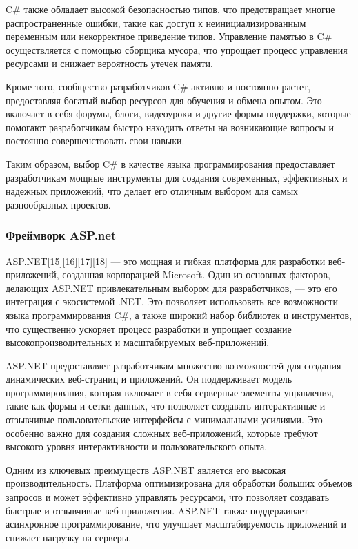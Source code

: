 C\# также обладает высокой безопасностью типов, что предотвращает многие распространенные ошибки, такие как доступ к неинициализированным переменным или некорректное приведение типов. Управление памятью в C\# осуществляется с помощью сборщика мусора, что упрощает процесс управления ресурсами и снижает вероятность утечек памяти.

Кроме того, сообщество разработчиков C\# активно и постоянно растет, предоставляя богатый выбор ресурсов для обучения и обмена опытом. Это включает в себя форумы, блоги, видеоуроки и другие формы поддержки, которые помогают разработчикам быстро находить ответы на возникающие вопросы и постоянно совершенствовать свои навыки.

Таким образом, выбор C\# в качестве языка программирования предоставляет разработчикам мощные инструменты для создания современных, эффективных и надежных приложений, что делает его отличным выбором для самых разнообразных проектов.

\subsubsection{Фреймворк ASP.net}

ASP.NET[{15}][{16}][{17}][{18}] — это мощная и гибкая платформа для разработки веб-приложений, созданная корпорацией Microsoft. Один из основных факторов, делающих ASP.NET привлекательным выбором для разработчиков, — это его интеграция с экосистемой .NET. Это позволяет использовать все возможности языка программирования C\#, а также широкий набор библиотек и инструментов, что существенно ускоряет процесс разработки и упрощает создание высокопроизводительных и масштабируемых веб-приложений.

ASP.NET предоставляет разработчикам множество возможностей для создания динамических веб-страниц и приложений. Он поддерживает модель программирования, которая включает в себя серверные элементы управления, такие как формы и сетки данных, что позволяет создавать интерактивные и отзывчивые пользовательские интерфейсы с минимальными усилиями. Это особенно важно для создания сложных веб-приложений, которые требуют высокого уровня интерактивности и пользовательского опыта.

Одним из ключевых преимуществ ASP.NET является его высокая производительность. Платформа оптимизирована для обработки больших объемов запросов и может эффективно управлять ресурсами, что позволяет создавать быстрые и отзывчивые веб-приложения. ASP.NET также поддерживает асинхронное программирование, что улучшает масштабируемость приложений и снижает нагрузку на серверы.

